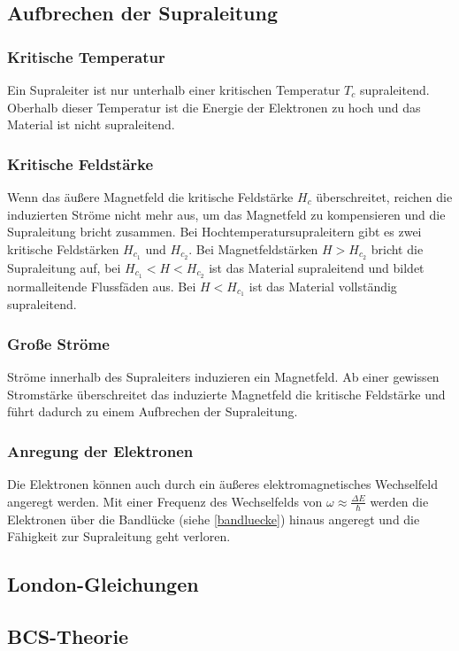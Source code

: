 \documentclass[12pt]{article}
\begin{document}
\subsection{Aufbrechen der Supraleitung}
\subsubsection{Kritische Temperatur}
Ein Supraleiter ist nur unterhalb einer kritischen Temperatur $T_c$ supraleitend. Oberhalb dieser Temperatur ist die Energie der Elektronen zu hoch und das Material ist nicht supraleitend.
\subsubsection{Kritische Feldstärke}
Wenn das äußere Magnetfeld die kritische Feldstärke $H_c$ überschreitet, reichen die induzierten Ströme nicht mehr aus, um das Magnetfeld zu kompensieren und die Supraleitung bricht zusammen. Bei Hochtemperatursupraleitern gibt es zwei kritische Feldstärken $H_{c_1}$ und  $H_{c_2}$. Bei Magnetfeldstärken $H>H_{c_2}$ bricht die Supraleitung auf, bei $H_{c_1}<H<H_{c_2}$ ist das Material supraleitend und bildet normalleitende Flussfäden aus. Bei $H<H_{c_1}$ ist das Material vollständig supraleitend.
\subsubsection{Große Ströme}
Ströme innerhalb des Supraleiters induzieren ein Magnetfeld. Ab einer gewissen Stromstärke überschreitet das induzierte Magnetfeld die kritische Feldstärke und führt dadurch zu einem Aufbrechen der Supraleitung.
\subsubsection{Anregung der Elektronen}
Die Elektronen können auch durch ein äußeres elektromagnetisches Wechselfeld angeregt werden. Mit einer Frequenz des Wechselfelds von $\omega\approx\frac{\Delta E}{\hbar}$ werden die Elektronen über die Bandlücke (siehe \ref{bandluecke}) hinaus angeregt und die Fähigkeit zur Supraleitung geht verloren.

\subsection{London-Gleichungen}

\subsection{BCS-Theorie}
\end{document}
